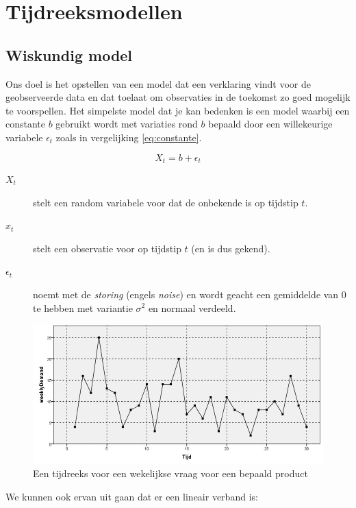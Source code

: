 \section{Tijdreeksmodellen}
\subsection{Wiskundig model}
Ons doel is het opstellen van een model dat een verklaring vindt voor de geobserveerde data en dat toelaat om observaties in de toekomst zo goed mogelijk te voorspellen. Het simpelste model dat je kan bedenken is een model waarbij een constante $b$ gebruikt wordt met variaties rond $b$ bepaald door een willekeurige variabele $\epsilon_{t}$ zoals in vergelijking \ref{eq:constante}. 

\begin{equation}
	X_{t} = b + \epsilon_{t}
\label{eq:constante}
\end{equation}

\begin{description}
	\item [$X_{t}$] stelt een random variabele voor dat de onbekende is op tijdstip $t$.
	\item [$x_{t}$] stelt een observatie voor op tijdstip $t$ (en is dus gekend). 
	\item [$\epsilon_{t}$] noemt met de \textit{storing} (engels \textsl{noise}) en wordt geacht een gemiddelde van $0$ te hebben met variantie $\sigma^{2}$ en normaal verdeeld. 
\end{description}

\begin{figure}[htbp]
	\centering
		\includegraphics[width=\textwidth]{images/tijdsreeksen/tijdsreeks11.jpg}
	\caption{Een tijdreeks voor een wekelijkse vraag voor een bepaald product}
	\label{fig:tijdreeks11}
\end{figure}


We kunnen ook ervan uit gaan dat er een lineair verband is:

